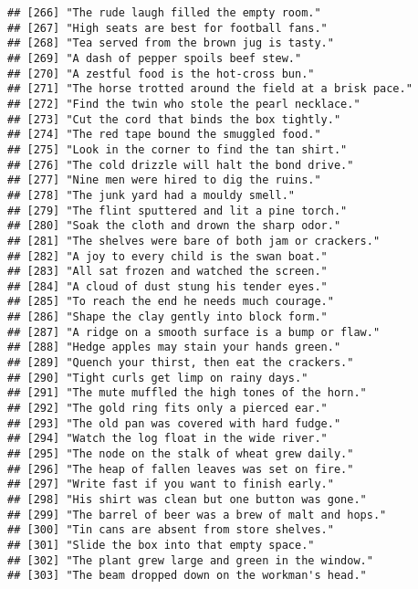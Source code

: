 \documentclass[
]{article}
\begin{document}
\begin{verbatim}
## [266] "The rude laugh filled the empty room."                    
## [267] "High seats are best for football fans."                   
## [268] "Tea served from the brown jug is tasty."                  
## [269] "A dash of pepper spoils beef stew."                       
## [270] "A zestful food is the hot-cross bun."                     
## [271] "The horse trotted around the field at a brisk pace."      
## [272] "Find the twin who stole the pearl necklace."              
## [273] "Cut the cord that binds the box tightly."                 
## [274] "The red tape bound the smuggled food."                    
## [275] "Look in the corner to find the tan shirt."                
## [276] "The cold drizzle will halt the bond drive."               
## [277] "Nine men were hired to dig the ruins."                    
## [278] "The junk yard had a mouldy smell."                        
## [279] "The flint sputtered and lit a pine torch."                
## [280] "Soak the cloth and drown the sharp odor."                 
## [281] "The shelves were bare of both jam or crackers."           
## [282] "A joy to every child is the swan boat."                   
## [283] "All sat frozen and watched the screen."                   
## [284] "A cloud of dust stung his tender eyes."                   
## [285] "To reach the end he needs much courage."                  
## [286] "Shape the clay gently into block form."                   
## [287] "A ridge on a smooth surface is a bump or flaw."           
## [288] "Hedge apples may stain your hands green."                 
## [289] "Quench your thirst, then eat the crackers."               
## [290] "Tight curls get limp on rainy days."                      
## [291] "The mute muffled the high tones of the horn."             
## [292] "The gold ring fits only a pierced ear."                   
## [293] "The old pan was covered with hard fudge."                 
## [294] "Watch the log float in the wide river."                   
## [295] "The node on the stalk of wheat grew daily."               
## [296] "The heap of fallen leaves was set on fire."               
## [297] "Write fast if you want to finish early."                  
## [298] "His shirt was clean but one button was gone."             
## [299] "The barrel of beer was a brew of malt and hops."          
## [300] "Tin cans are absent from store shelves."                  
## [301] "Slide the box into that empty space."                     
## [302] "The plant grew large and green in the window."            
## [303] "The beam dropped down on the workman's head."             

\end{verbatim}
\end{document}

